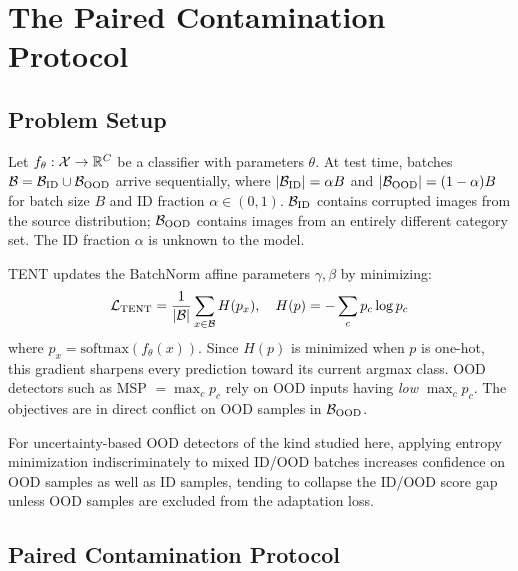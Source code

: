 \section{The Paired Contamination Protocol}
\label{sec:protocol}

\subsection{Problem Setup}

Let $f_\theta : \mathcal{X} \to \mathbb{R}^C$ be a classifier with parameters $\theta$.
At test time, batches $\mathcal{B} = \mathcal{B}_{\text{ID}} \cup \mathcal{B}_{\text{OOD}}$ arrive sequentially, where $|\mathcal{B}_{\text{ID}}| = \alpha B$ and $|\mathcal{B}_{\text{OOD}}| = (1-\alpha)B$ for batch size $B$ and ID fraction $\alpha \in (0,1)$.
$\mathcal{B}_{\text{ID}}$ contains corrupted images from the source distribution; $\mathcal{B}_{\text{OOD}}$ contains images from an entirely different category set.
The ID fraction $\alpha$ is unknown to the model.

TENT \citep{tent} updates the BatchNorm affine parameters $\gamma, \beta$ by minimizing:
\begin{equation}
  \mathcal{L}_{\text{TENT}} = \frac{1}{|\mathcal{B}|} \sum_{x \in \mathcal{B}} H(p_x), \quad H(p) = -\sum_c p_c \log p_c
  \label{eq:tent_loss}
\end{equation}
where $p_x = \text{softmax}(f_\theta(x))$.
Since $H(p)$ is minimized when $p$ is one-hot, this gradient sharpens every prediction toward its current argmax class.
OOD detectors such as MSP $= \max_c p_c$ rely on OOD inputs having \emph{low} $\max_c p_c$.
The objectives are in direct conflict on OOD samples in $\mathcal{B}_{\text{OOD}}$.

\begin{observation}
\label{obs:conflict}
For uncertainty-based OOD detectors of the kind studied here, applying entropy minimization indiscriminately to mixed ID/OOD batches increases confidence on OOD samples as well as ID samples, tending to collapse the ID/OOD score gap unless OOD samples are excluded from the adaptation loss.
\end{observation}

\subsection{Paired Contamination Protocol}

